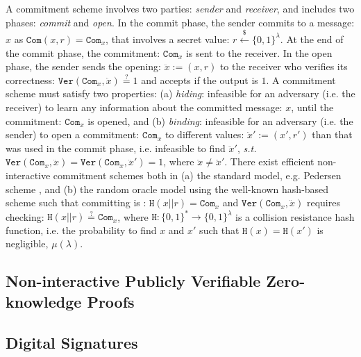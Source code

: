  A commitment scheme involves two parties:  \emph{sender} and  \emph{receiver}, and includes  two phases: \emph{commit} and  \emph{open}. In the commit phase, the sender  commits to a message: $x$ as $\mathtt{Com}(x,r)=\mathtt{Com}_{\scriptscriptstyle x}$, that involves a secret value: $r\stackrel{\scriptscriptstyle\$}\leftarrow \{0,1\}^{\scriptscriptstyle\lambda}$. At the end of the commit phase,  the commitment: $\mathtt{Com}_{\scriptscriptstyle x}$ is sent to the receiver. In the open phase, the sender sends the opening: $\ddot{x}:=(x,r)$ to the receiver who verifies its correctness: $\mathtt{Ver}(\mathtt{Com}_{\scriptscriptstyle x},\ddot{x})\stackrel{\scriptscriptstyle ?}=1$ and accepts if the output is $1$.  A commitment scheme must satisfy two properties: (a) \textit{hiding}: infeasible for an adversary (i.e. the receiver) to learn any information about the committed  message: $x$, until the commitment: $\mathtt{Com}_{\scriptscriptstyle x}$ is opened, and (b) \textit{binding}:   infeasible for an adversary (i.e. the sender) to open a commitment: $\mathtt{Com}_{\scriptscriptstyle x}$ to different values: $\ddot{x}':=(x',r')$ than that was  used in the commit phase, i.e. infeasible to find  $\ddot{x}'$, \textit{s.t.} $\mathtt{Ver}(\mathtt{Com}_{\scriptscriptstyle x},\ddot{x})=\mathtt{Ver}(\mathtt{Com}_{\scriptscriptstyle x},\ddot{x}')=1$, where $\ddot{x}\neq \ddot{x}'$.  There exist efficient non-interactive  commitment schemes both in (a) the standard model, e.g. Pedersen scheme \cite{Pedersen91}, and (b)  the random oracle model using the well-known hash-based scheme such that committing  is : $\mathtt{H}(x||r)=\mathtt{Com}_{\scriptscriptstyle x}$ and $\mathtt{Ver}(\mathtt{Com}_{\scriptscriptstyle x},\ddot{x})$ requires checking: $\mathtt{H}(x||r)\stackrel{\scriptscriptstyle ?}=\mathtt{Com}_{\scriptscriptstyle x}$, where $\mathtt{H}:\{0,1\}^{\scriptscriptstyle *}\rightarrow \{0,1\}^{\scriptscriptstyle \lambda}$ is a collision resistance hash function, i.e. the probability to find $x$ and $x'$ such that $\mathtt{H}(x)=\mathtt{H}(x')$ is negligible, $\mu(\lambda)$.




\subsection{Non-interactive Publicly Verifiable Zero-knowledge Proofs}

\subsection{Digital Signatures}


